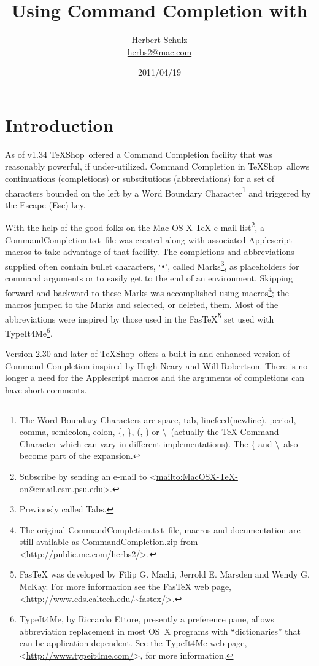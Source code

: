 \documentclass[11pt]{article}
\title{Using Command Completion with \\ \TS}
\author{Herbert Schulz\\\small\href{mailto:herbs2@mac.com}{herbs2@mac.com}}
\date{2011/04/19}
\newcommand{\esckey}{\textsf{Esc}}
\newcommand{\fastex}{Fas\hspace{-.15em}\TeX}
\newcommand{\TS}{\textsf{\TeX Shop}}
\newcommand{\CCT}{\textsf{CommandCompletion.txt}}
\begin{document}
\maketitle
\thispagestyle{empty}

\section*{Introduction}

As of v1.34 \TS\ offered a Command Completion facility that was reasonably powerful, if under-utilized. Command Completion in \TS\ allows continuations (completions) or substitutions (abbreviations) for a set of characters bounded on the left by a \textsf{Word Boundary Character}\footnote{The \textsf{Word Boundary Characters} are space, tab, linefeed(newline), period, comma, semicolon, colon, \{, \}, (, ) or \textbackslash\ (actually the \textsf{TeX Command Character} which can vary in different implementations). The \{ and \textbackslash\ also become part of the expansion.} and triggered by the Escape (\esckey) key.

With the help of the good folks on the \textsf{Mac OS X TeX} e-mail list\footnote{Subscribe by sending an e-mail to <\url{mailto:MacOSX-TeX-on@email.esm.psu.edu}>.}, a \CCT\ file was created along with associated Applescript macros to take advantage of that facility. The completions and abbreviations supplied often contain bullet characters, `\texttt{•}', called Marks\footnote{Previously called Tabs.}, as placeholders for command arguments or to easily get to the end of an environment. Skipping forward and backward to these Marks was accomplished using macros\footnote{The original \CCT\ file, macros and documentation are still available as \textsf{CommandCompletion.zip} from  <\url{http://public.me.com/herbs2/}>.}; the macros jumped to the Marks and selected, or deleted, them. Most of the abbreviations were inspired by those used in the \textsf{\fastex}\footnote{\textsf{\fastex} was developed by Filip G. Machi, Jerrold E. Marsden and Wendy G. McKay. For more information see the \textsf{\fastex} web page, <\url{http://www.cds.caltech.edu/~fastex/}>.} set used with \textsf{TypeIt4Me}\footnote{\textsf{TypeIt4Me}, by Riccardo Ettore, presently a preference pane, allows abbreviation replacement in most OS~X programs with ``dictionaries'' that can be application dependent. See the \textsf{TypeIt4Me} web page, <\url{http://www.typeit4me.com/}>, for more information.}.

Version 2.30 and later of \TS\ offers a built-in and enhanced version of Command Completion inspired by Hugh Neary and Will Robertson. There is no longer a need for the Applescript macros and the arguments of completions can have short comments.
\end{document}
